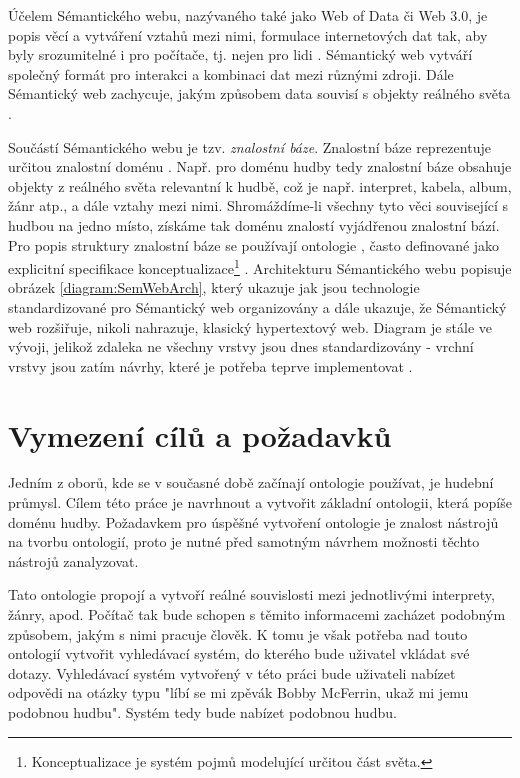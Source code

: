 Účelem Sémantického webu, nazývaného také jako Web of Data či Web 3.0, je popis věcí a vytváření vztahů mezi nimi, formulace internetových dat tak, aby byly srozumitelné i pro počítače, tj. nejen pro lidi \cite{zdrojakSemWeb}.   
Sémantický web vytváří společný formát pro interakci a kombinaci dat mezi různými zdroji. Dále Sémantický web zachycuje, jakým způsobem data souvisí s objekty reálného světa \cite{semWeb}.

Součástí Sémantického webu je tzv. \textit{znalostní báze}. Znalostní báze reprezentuje určitou znalostní doménu \cite{kunc}. Např. pro doménu hudby tedy znalostní báze obsahuje objekty z reálného světa relevantní k hudbě, což je např. interpret, kabela, album, žánr atp., a dále vztahy mezi nimi. Shromáždíme-li všechny tyto věci související s hudbou na jedno místo, získáme tak doménu znalostí vyjádřenou znalostní bází.
Pro popis struktury znalostní báze se používají ontologie \cite{obitko}, často definované jako explicitní specifikace konceptualizace\footnote{Konceptualizace je systém pojmů modelující určitou část světa.} \cite{gruber}.
Architekturu Sémantického webu popisuje obrázek \ref{diagram:SemWebArch}, který ukazuje jak jsou technologie standardizované pro Sémantický web organizovány a dále ukazuje, že Sémantický web rozšiřuje, nikoli nahrazuje, klasický hypertextový web. Diagram je stále ve vývoji, jelikož zdaleka ne všechny vrstvy jsou dnes standardizovány - vrchní vrstvy jsou zatím návrhy, které je potřeba teprve implementovat \cite{semWebStack}.

\section{Vymezení cílů a požadavků}  

Jedním z oborů, kde se v současné době začínají ontologie používat, je hudební průmysl. 
Cílem této práce je navrhnout a vytvořit základní ontologii, která popíše doménu hudby.
Požadavkem pro úspěšné vytvoření ontologie je znalost nástrojů na tvorbu ontologií, proto je nutné před samotným návrhem možnosti těchto nástrojů zanalyzovat.

Tato ontologie propojí a vytvoří reálné souvislosti mezi jednotlivými interprety, žánry, apod. 
Počítač tak bude schopen s těmito informacemi zacházet podobným způsobem, jakým s nimi pracuje člověk.  
K tomu je však potřeba nad touto ontologií vytvořit vyhledávací systém, do kterého bude uživatel vkládat své dotazy.
Vyhledávací systém vytvořený v této práci bude uživateli nabízet odpovědi na otázky typu "líbí se mi zpěvák Bobby McFerrin, ukaž mi jemu podobnou hudbu". Systém tedy bude nabízet podobnou hudbu. 

